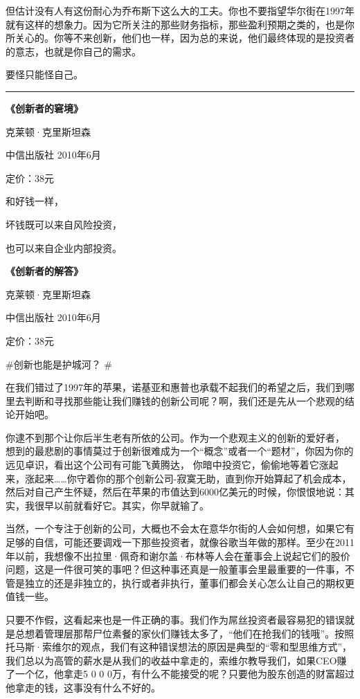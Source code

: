 但估计没有人有这份耐心为乔布斯下这么大的工夫。你也不要指望华尔街在1997年就有这样的想象力。因为它所关注的那些财务指标，那些盈利预期之类的，也是你所关心的。你等不来创新，他们也一样，因为总的来说，他们最终体现的是投资者的意志，也就是你自己的需求。

要怪只能怪自己。

\begin{center}\rule{0.5\linewidth}{0.5pt}\end{center}

\textbf{《创新者的窘境》}

克莱顿·克里斯坦森

中信出版社 2010年6月

定价：38元

和好钱一样，

坏钱既可以来自风险投资，

也可以来自企业内部投资。

\textbf{《创新者的解答》}

克莱顿·克里斯坦森

中信出版社 2010年6月

定价：38元

\#创新也能是护城河？ \#

在我们错过了1997年的苹果，诺基亚和惠普也承载不起我们的希望之后，我们到哪里去判断和寻找那些能让我们赚钱的创新公司呢？啊，我们还是先从一个悲观的结论开始吧。

你逮不到那个让你后半生老有所依的公司。作为一个悲观主义的创新的爱好者，
想到的最悲剧的事情莫过于创新很难成为一个``概念''或者一个``题材''，你因为你的远见卓识，看出这个公司有可能飞黄腾达，
你暗中投资它，偷偷地等着它涨起来，涨起来\ldots\ldots 你守着你的那个创新公司-寂寞无助，直到你开始算起了机会成本，然后对自己产生怀疑，然后在苹果的市值达到6000亿美元的时候，你恨恨地说：其实，我很早以前就看好它。其实，你早就输了。

当然，一个专注于创新的公司，大概也不会太在意华尔街的人会如何想，如果它有足够的自信，可能还要调戏一下那些投资者，就像谷歌当年做的那样。至少在2011年以前，我想像不出拉里·佩奇和谢尔盖·布林等人会在董事会上说起它们的股价问题，这是一件很可笑的事吧？但这种事还真是一般董事会里最重要的一件事，不管是独立的还是非独立的，执行或者非执行，董事们都会关心怎么让自己的期权更值钱一些。

只要不作假，这看起来也是一件正确的事。我们作为屌丝投资者最容易犯的错误就是总想着管理层那帮尸位素餐的家伙们赚钱太多了，``他们在抢我们的钱哦''。按照托马斯·索维尔的观点，我们有这种错误想法的原因是典型的``零和型思维方式''，
我们总以为高管的薪水是从我们的收益中拿走的，索维尔教导我们，如果CEO赚了一个亿，他拿走5
0 0
0万，有什么不能接受的呢？只要他为股东创造的财富超过他拿走的钱，这事没有什么不好的。

